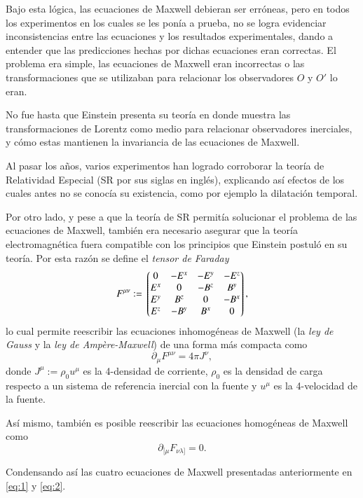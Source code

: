 Bajo esta lógica, las ecuaciones de Maxwell debieran ser erróneas, pero en todos los experimentos en los cuales se les ponía a prueba, no se logra evidenciar inconsistencias entre las ecuaciones y los resultados experimentales, dando a entender que las predicciones hechas por dichas ecuaciones eran correctas. El problema era simple, las ecuaciones de Maxwell eran incorrectas o las transformaciones que se utilizaban para relacionar los observadores $O$ y $O'$ lo eran.

No fue hasta que Einstein presenta su teoría en donde muestra las transformaciones de Lorentz como medio para relacionar observadores inerciales, y cómo estas mantienen la invariancia de las ecuaciones de Maxwell.

Al pasar los años, varios experimentos han logrado corroborar la teoría de Relatividad Especial (SR por sus siglas en inglés), explicando así efectos de los cuales antes no se conocía su existencia, como por ejemplo la dilatación temporal.

Por otro lado, y pese a que la teoría de SR permitía solucionar el problema de las ecuaciones de Maxwell, también era necesario asegurar que la teoría electromagnética fuera compatible con los principios que Einstein postuló en su teoría. Por esta razón se define el \textit{tensor de Faraday}
\begin{equation}
F^{\mu \nu} := \mqty*(
0 & -E^x & -E^y & -E^z \\
E^x & 0 & -B^z & B^y \\
E^y & B^z & 0 & -B^x \\
E^z & -B^y & B^x & 0 \\ 
),
\end{equation}
lo cual permite reescribir las ecuaciones inhomogéneas de Maxwell (la \textit{ley de Gauss} y la \textit{ley de Ampère-Maxwell}) de una forma más compacta como
\begin{equation}
\label{eq:1}
\partial_{\mu} F^{\mu \nu} = 4\pi J^{\nu},
\end{equation}
donde $J^{\mu} := \rho_0 u^{\mu}$ es la 4-densidad de corriente, $\rho_0$ es la densidad de carga respecto a un sistema de referencia inercial con la fuente y $u^{\mu}$ es la 4-velocidad de la fuente.

Así mismo, también es posible reescribir las ecuaciones homogéneas de Maxwell como
\begin{equation}
\label{eq:2}
\partial_{[\mu} F_{\nu \lambda]} = 0.
\end{equation}

Condensando así las cuatro ecuaciones de Maxwell presentadas anteriormente en \eqref{eq:1} y \eqref{eq:2}.

